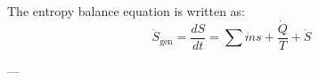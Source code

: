 The entropy balance equation is written as:  
\[
\dot{S}_{\text{gen}} = \frac{dS}{dt} = \sum \dot{m}s + \frac{\dot{Q}}{T} + \dot{S}
\]  

---
